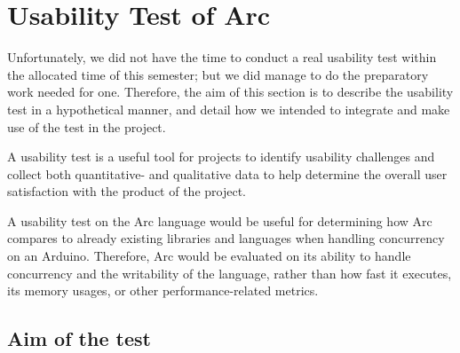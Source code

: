 \section{Usability Test of Arc}\label{subsec:usabilityTestOfArc}

Unfortunately, we did not have the time to conduct a real usability test within the allocated time of this semester; but we did manage to do the preparatory work needed for one. Therefore, the aim of this section is to describe the usability test in a hypothetical manner, and detail how we intended to integrate and make use of the test in the project.

A usability test is a useful tool for projects to identify usability challenges and collect both quantitative- and qualitative data to help determine the overall user satisfaction with the product of the project.

A usability test on the Arc language would be useful for determining how Arc compares to already existing libraries and languages when handling concurrency on an Arduino. Therefore, Arc would be evaluated on its ability to handle concurrency and the writability of the language, rather than how fast it executes, its memory usages, or other performance-related metrics.




\subsection{Aim of the test}\label{subsubsec:aimOfTheTest}

